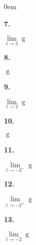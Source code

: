 \documentclass[12pt,]{book}
\theoremstyle{plain}
\theoremstyle{definition}
\numberwithin{equation}{section}
\newenvironment{exercisegroup}%
{\medskip\noindent}%
{\par\bigskip}%
\newlength{\exercisegroupindent}%
\newlength{\exercisegroupitemwidth}%
\newenvironment{exercisegrouplist}%
{\vspace{-\partopsep}%
\begin{adjustwidth}{\exercisegroupindent}{0em}}%
{\end{adjustwidth}%
\vspace{-\partopsep}%
\vspace{\baselineskip}}%
\newenvironment{exercisegroupbycol}[1]%
{\begin{exercisegrouplist}%
\vspace{-\multicolsep}%
\begin{multicols}{#1}%
\setlength{\parindent}{0em}%
\setlength{\exercisegroupitemwidth}{\linewidth}}%
{\end{multicols}%
\vspace{-\multicolsep}%
\end{exercisegrouplist}}%
\newenvironment{exercisegroupitem}[1]%
{\begin{minipage}[t]{\exercisegroupitemwidth}
\vspace{0pt}%
{\bfseries#1}%
\rule{0pt}{\baselineskip}}{\strut%
\end{minipage}%
\hspace{\columnsep}}%
\providecommand\phantomsection{}
\newcommand{\fe}[2]{\mathop{{#1}{\left(#2\right)}}}
\begin{document}
\begin{exercisegroup}
\begin{exercisegroupbycol}{4}
\par%
\begin{exercisegroupitem}{7. }\phantomsection\hypertarget{exercise-36}{\null}
\(\lim\limits_{t\to3}\fe{g}{t}\)%
\end{exercisegroupitem}%
\par%
\begin{exercisegroupitem}{8. }\phantomsection\hypertarget{exercise-37}{\null}
\(\fe{g}{2}\)%
\end{exercisegroupitem}%
\par%
\begin{exercisegroupitem}{9. }\phantomsection\hypertarget{exercise-38}{\null}
\(\lim\limits_{t\to2}\fe{g}{t}\)%
\end{exercisegroupitem}%
\par%
\begin{exercisegroupitem}{10. }\phantomsection\hypertarget{exercise-39}{\null}
\(\fe{g}{-2}\)%
\end{exercisegroupitem}%
\par%
\begin{exercisegroupitem}{11. }\phantomsection\hypertarget{exercise-40}{\null}
\(\lim\limits_{t\to-2^{-}}\fe{g}{t}\)%
\end{exercisegroupitem}%
\par%
\begin{exercisegroupitem}{12. }\phantomsection\hypertarget{exercise-41}{\null}
\(\lim\limits_{t\to-2^{+}}\fe{g}{t}\)%
\end{exercisegroupitem}%
\par%
\begin{exercisegroupitem}{13. }\phantomsection\hypertarget{exercise-42}{\null}
\(\lim\limits_{t\to-2}\fe{g}{t}\)%
\end{exercisegroupitem}%
\par%
\end{exercisegroupbycol}%
\end{exercisegroup}%
\end{document}
